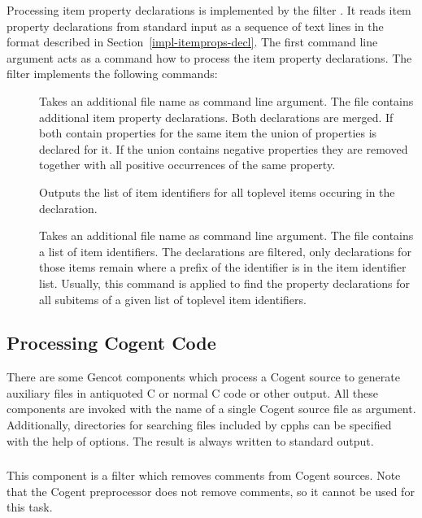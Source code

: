 Processing item property declarations is implemented by the filter . It reads item property declarations
from standard input as a sequence of text lines in the format described in Section~\ref{impl-itemprops-decl}. The first command line 
argument acts as a command how to process the item property declarations. The filter implements the following
commands:
\begin{description}

\item[]
Takes an additional file name as command line argument. The file contains additional item property declarations.
Both declarations are merged. If both contain properties for the same item the union of properties is declared for it.
If the union contains negative properties they are removed together with all positive occurrences of the same
property. 
\item[]
Outputs the list of item identifiers for all toplevel items occuring in the declaration.
\item[]
Takes an additional file name as command line argument. The file contains a list of item identifiers.
The declarations are filtered, only declarations for those items remain where a prefix of the identifier is in the 
item identifier list. Usually, this command is applied to find the property declarations for all subitems of
a given list of toplevel item identifiers.

\end{description}

\subsection{Processing Cogent Code}
\label{impl-ocomps-cogent}

There are some Gencot components which process a Cogent source to generate auxiliary files in antiquoted C or normal C code
or other output.
All these components are invoked with the name of a single Cogent source file as argument. Additionally, directories for
searching files included by cpphs can be specified with the help of  options. The result is always written to 
standard output.

\subsubsection{}

This component is a filter which removes comments from Cogent sources. Note that the Cogent preprocessor 
does not remove comments, so it cannot be used for this task.

